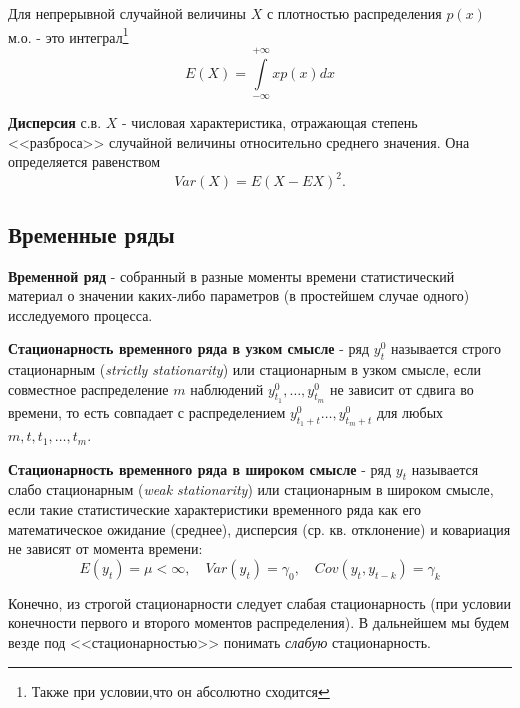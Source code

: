 \documentclass{article}
\begin{document}
  Для непрерывной случайной величины $X$ с плотностью распределения $p(x)$ м.о. - это интеграл\footnote{Также при условии,что он абсолютно сходится}
  \begin{equation}
    E(X) = \int\limits_{-\infty}^{+\infty} xp(x)dx
  \end{equation}
  
  \textbf{Дисперсия} с.в. $X$ - числовая характеристика, отражающая степень <<разброса>> случайной величины относительно среднего значения. Она определяется равенством
  \begin{equation}
    Var(X) = E(X - EX)^2.
  \end{equation}\par
  
  
  \subsection{Временные ряды}
  
  \textbf{Временной ряд} - собранный в разные моменты времени статистический материал о значении каких-либо параметров (в простейшем случае одного) исследуемого процесса.\par
  
  \textbf{Стационарность временного ряда в узком смысле} - ряд $y_t^0$ называется строго стационарным (\textsl{strictly stationarity}) или стационарным в узком смысле, если совместное распределение $m$ наблюдений $y_{t_1}^0, \ldots, y_{t_m}^0$ не зависит от сдвига во времени, то есть совпадает с распределением $y_{t_1+t}^0 \ldots, y_{t_m+t}^0$ для любых $m, t, t_1, \ldots, t_m$.\par
  
  \textbf{Стационарность временного ряда в широком смысле} - ряд $y_t$ называется слабо стационарным (\textsl{weak stationarity}) или стационарным в широком смысле, если такие статистические характеристики временного ряда как его математическое ожидание (среднее), дисперсия (ср. кв. отклонение) и ковариация не зависят от момента времени:
  \begin{equation}
    {E(y_t) = \mu < \infty, \quad Var(y_t) = \gamma_0, \quad Cov(y_t, y_{t-k}) = \gamma_k}
  \end{equation}\par
  
  Конечно, из строгой стационарности следует слабая стационарность (при условии конечности первого и второго моментов распределения). В дальнейшем мы будем везде под <<стационарностью>> понимать \textsl{слабую} стационарность.\par 
  
\end{document}
